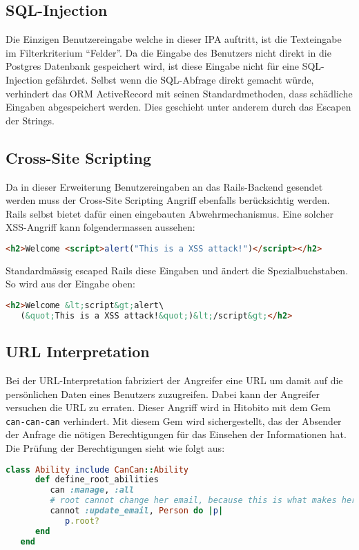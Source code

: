 \subsection{SQL-Injection}
Die Einzigen Benutzereingabe welche in dieser IPA auftritt, ist die Texteingabe im Filterkriterium ``Felder''. 
Da die Eingabe des Benutzers nicht direkt in die Postgres Datenbank gespeichert wird,
ist diese Eingabe nicht für eine SQL-Injection gefährdet. Selbst wenn die SQL-Abfrage direkt gemacht würde,
verhindert das ORM ActiveRecord mit seinen Standardmethoden, dass schädliche Eingaben abgespeichert werden.
Dies geschieht unter anderem durch das Escapen der Strings.

\subsection{Cross-Site Scripting}
Da in dieser Erweiterung Benutzereingaben an das Rails-Backend gesendet werden muss der Cross-Site Scripting Angriff ebenfalls
berücksichtig werden. Rails selbst bietet dafür einen eingebauten Abwehrmechanismus. Eine solcher XSS-Angriff kann folgendermassen aussehen:

\begin{lstlisting}[language=HTML]
   <h2>Welcome <script>alert("This is a XSS attack!")</script></h2>
\end{lstlisting}

Standardmässig escaped Rails diese Eingaben und ändert die Spezialbuchstaben. So wird aus der Eingabe oben:

\begin{lstlisting}[language=HTML]
   <h2>Welcome &lt;script&gt;alert\
   (&quot;This is a XSS attack!&quot;)&lt;/script&gt;</h2>
\end{lstlisting}

\subsection{URL Interpretation}
Bei der URL-Interpretation fabriziert der Angreifer eine URL um damit auf die persönlichen
Daten eines Benutzers zuzugreifen. Dabei kann der Angreifer versuchen die URL zu erraten. 
Dieser Angriff wird in Hitobito mit dem Gem \texttt{can-can-can} verhindert. Mit diesem Gem wird sichergestellt,
das der Absender der Anfrage die nötigen Berechtigungen für das Einsehen der Informationen hat. Die Prüfung der Berechtigungen sieht wie folgt
aus: 

\begin{lstlisting}[language=Ruby]
   class Ability include CanCan::Ability
      def define_root_abilities
         can :manage, :all
         # root cannot change her email, because this is what makes her root.
         cannot :update_email, Person do |p|
            p.root?
      end
   end
\end{lstlisting}
   
